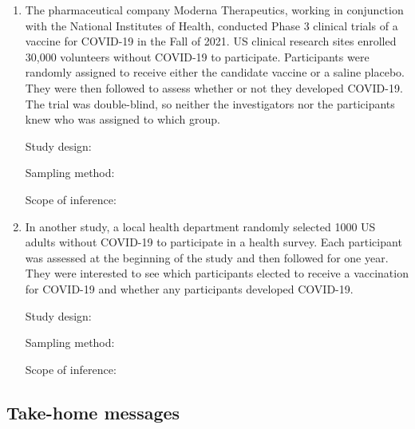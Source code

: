 \documentclass[
]{report}
\begin{document}
\begin{enumerate}
\def\labelenumi{\arabic{enumi}.}
\setcounter{enumi}{11}
\item
  The pharmaceutical company Moderna Therapeutics, working in conjunction with the National Institutes of Health, conducted Phase 3 clinical trials of a vaccine for COVID-19 in the Fall of 2021. US clinical research sites enrolled 30,000 volunteers without COVID-19 to participate. Participants were randomly assigned to receive either the candidate vaccine or a saline placebo. They were then followed to assess whether or not they developed COVID-19. The trial was double-blind, so neither the investigators nor the participants knew who was assigned to which group.
  \vspace{0.1in}

  Study design:
  \vspace{0.3in}

  Sampling method:
  \vspace{0.3in}

  Scope of inference:
  \newpage
\item
  In another study, a local health department randomly selected 1000 US adults without COVID-19 to participate in a health survey. Each participant was assessed at the beginning of the study and then followed for one year. They were interested to see which participants elected to receive a vaccination for COVID-19 and whether any participants developed COVID-19.
  \vspace{0.1in}

  Study design:
  \vspace{0.3in}

  Sampling method:
  \vspace{0.3in}

  Scope of inference:
  \vspace{0.3in}
\end{enumerate}

\subsection{Take-home messages}\label{take-home-messages-13}
\end{document}
